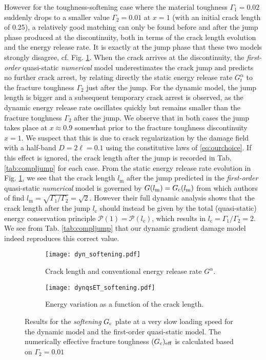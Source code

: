 However for the toughness-softening case where the material toughness $\Gamma_1=0.02$ suddenly drops to a smaller value $\Gamma_2=0.01$ at $x=1$ (with an initial crack length of 0.25), a relatively good matching can only be found before and after the jump phase produced at the discontinuity, both in terms of the crack length evolution and the energy release rate. It is exactly at the jump phase that these two models strongly disagree, cf. Fig. \ref{fig:softGcqs}. When the crack arrives at the discontinuity, the \emph{first-order} quasi-static \emph{numerical} model underestimates the crack jump and predicts no further crack arrest, by relating directly the static energy release rate $G^\alpha_t$ to the fracture toughness $\Gamma_2$ just after the jump. For the dynamic model, the jump length is bigger and a subsequent temporary crack arrest is observed, as the dynamic energy release rate oscillates quickly but remains smaller than the fracture toughness $\Gamma_2$ after the jump. We observe that in both cases the jump takes place at $x\approx 0.9$ somewhat prior to the fracture toughness discontinuity $x=1$. We suspect that this is due to crack regularization by the damage field with a half-band $D=2\ell=0.1$ using the constitutive laws of \eqref{eq:ourchoice}. If this effect is ignored, the crack length after the jump is recorded in Tab. \ref{tab:compljump} for each case. From the static energy release rate evolution in Fig. \ref{fig:softGcqs}, we see that the crack length $l_\mathrm{m}$ after the jump predicted in the \emph{first-order} quasi-static \emph{numerical} model is governed by $G(l_\mathrm{m})=G_\mathrm{c}(l_\mathrm{m})$ from which authors of \cite{DumouchelMarigoCharlotte:2008} find $l_\mathrm{m}=\sqrt{\Gamma_1/\Gamma_2}=\sqrt{2}$. However their full dynamic analysis shows that the crack length after the jump $l_\mathrm{c}$ should instead be given by the total (quasi-static) energy conservation principle $\mathcal{P}(1)=\mathcal{P}(l_\mathrm{c})$, which results in $l_\mathrm{c}=\Gamma_1/\Gamma_2=2$. We see from Tab. \ref{tab:compljump} that our dynamic gradient damage model indeed reproduces this correct value.
\begin{figure}[htbp]
\centering
\begin{subfigure}[b]{0.48\textwidth}
\centering
\texttt{[image: dyn\_softening.pdf]}
\caption{Crack length and conventional energy release rate $G^\alpha$.} \label{fig:softGcqs}
\end{subfigure}
\begin{subfigure}[b]{0.48\textwidth}
\centering
\texttt{[image: dynqsET\_softening.pdf]}
\caption{Energy variation as a function of the crack length.} \label{fig:evoRNJjump}
\end{subfigure}
\caption{Results for the \emph{softening} $G_\mathrm{c}$ plate at a very slow loading speed for the dynamic model and the first-order quasi-static model. The numerically effective fracture toughness $(G_\mathrm{c})_\mathrm{eff}$ is calculated based on $\Gamma_2=0.01$}
\end{figure}
